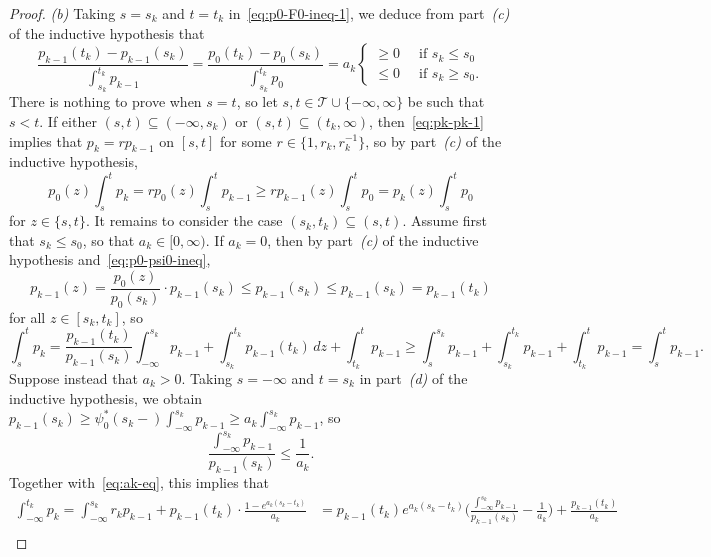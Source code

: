 \documentclass[a4paper]{article}
\theoremstyle{definition}
\begin{document}
\begin{proof}
\medskip
\noindent
\textit{(b)} Taking $s = s_k$ and $t = t_k$ in~\eqref{eq:p0-F0-ineq-1}, we deduce from part~\textit{(c)} of the inductive hypothesis that
\begin{equation}
\label{eq:ak-eq}
\frac{p_{k-1}(t_k) - p_{k-1}(s_k)}{\int_{s_k}^{t_k} p_{k-1}} = \frac{p_0(t_k) - p_0(s_k)}{\int_{s_k}^{t_k} p_0} = a_k
\begin{cases}
\geq 0 \;\;&\text{if }s_k \leq s_0 \\
\leq 0 \;\;&\text{if }s_k \geq s_0.
\end{cases}
\end{equation}
There is nothing to prove when $s = t$, so let $s,t \in \mathcal{T} \cup \{-\infty,\infty\}$ be such that $s < t$. If either $(s,t) \subseteq (-\infty,s_k)$ or $(s,t) \subseteq (t_k,\infty)$, then~\eqref{eq:pk-pk-1} implies that $p_k = rp_{k-1}$ on $[s,t]$ for some $r \in \{1,r_k,r_k^{-1}\}$, so by part~\textit{(c)} of the inductive hypothesis,
\[
p_0(z) \int_s^t p_k = rp_0(z) \int_s^t p_{k-1} \geq rp_{k-1}(z) \int_s^t p_0 = p_k(z) \int_s^t p_0
\]
for $z \in \{s,t\}$. It remains to consider the case $(s_k,t_k) \subseteq (s,t)$. Assume first that $s_k \leq s_0$, so that $a_k \in [0,\infty)$. If $a_k = 0$, then by part~\textit{(c)} of the inductive hypothesis and~\eqref{eq:p0-psi0-ineq},
\[
p_{k-1}(z) = \frac{p_0(z)}{p_0(s_k)} \cdot p_{k-1}(s_k) \leq p_{k-1}(s_k) \leq p_{k-1}(s_k) = p_{k-1}(t_k)
\]
for all $z \in [s_k,t_k]$, so
\[
\int_s^t p_k = \frac{p_{k-1}(t_k)}{p_{k-1}(s_k)}\int_{-\infty}^{s_k} p_{k-1} + \int_{s_k}^{t_k}p_{k-1}(t_k)\,dz + \int_{t_k}^t p_{k-1} \geq \int_s^{s_k} p_{k-1} + \int_{s_k}^{t_k}p_{k-1} + \int_{t_k}^t p_{k-1} = \int_s^t p_{k-1}.
\]
Suppose instead that $a_k > 0$. Taking $s = -\infty$ and $t = s_k$ in part~\textit{(d)} of the inductive hypothesis, we obtain $p_{k-1}(s_k) \geq \psi_0^*(s_k-)\int_{-\infty}^{s_k}p_{k-1} \geq a_k\int_{-\infty}^{s_k}p_{k-1}$, so
\[
\frac{\int_{-\infty}^{s_k}p_{k-1}}{p_{k-1}(s_k)} \leq \frac{1}{a_k}.
\]
Together with~\eqref{eq:ak-eq}, this implies that
\begin{align*}
\int_{-\infty}^{t_k}p_k = \int_{-\infty}^{s_k} r_k p_{k-1} + p_{k-1}(t_k) \cdot \frac{1 - e^{a_k(s_k - t_k)}}{a_k} &= p_{k-1}(t_k)e^{a_k(s_k - t_k)}\biggl(\frac{\int_{-\infty}^{s_k} p_{k-1}}{p_{k-1}(s_k)} - \frac{1}{a_k}\biggr) + \frac{p_{k-1}(t_k)}{a_k} \\

\end{align*}
\end{proof}
\end{document}
